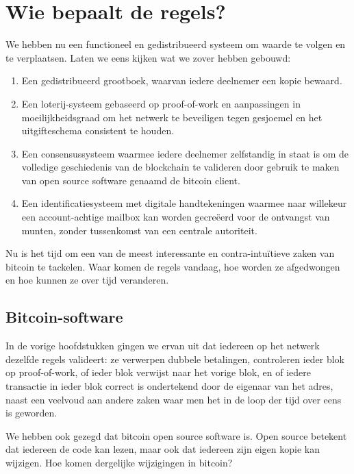 \documentclass[
  letterpaper,
]{scrbook}
\begin{document}
\hypertarget{wie-bepaalt-de-regels}{%
\chapter{Wie bepaalt de regels?}\label{wie-bepaalt-de-regels}}

We hebben nu een functioneel en gedistribueerd systeem om waarde te
volgen en te verplaatsen. Laten we eens kijken wat we zover hebben
gebouwd:

\begin{enumerate}
\def\labelenumi{\arabic{enumi}.}
\item
  Een gedistribueerd grootboek, waarvan iedere deelnemer een kopie
  bewaard.
\item
  Een loterij-systeem gebaseerd op proof-of-work en aanpassingen in
  moeilijkheidsgraad om het netwerk te beveiligen tegen gesjoemel en het
  uitgifteschema consistent te houden.
\item
  Een consensussysteem waarmee iedere deelnemer zelfstandig in staat is
  om de volledige geschiedenis van de blockchain te valideren door
  gebruik te maken van open source software genaamd de bitcoin client.
\item
  Een identificatiesysteem met digitale handtekeningen waarmee naar
  willekeur een account-achtige mailbox kan worden gecreëerd voor de
  ontvangst van munten, zonder tussenkomst van een centrale autoriteit.
\end{enumerate}

Nu is het tijd om een van de meest interessante en contra-intuïtieve
zaken van bitcoin te tackelen. Waar komen de regels vandaag, hoe worden
ze afgedwongen en hoe kunnen ze over tijd veranderen.

\hypertarget{bitcoin-software}{%
\section{Bitcoin-software}\label{bitcoin-software}}

In de vorige hoofdstukken gingen we ervan uit dat iedereen op het
netwerk dezelfde regels valideert: ze verwerpen dubbele betalingen,
controleren ieder blok op proof-of-work, of ieder blok verwijst naar het
vorige blok, en of iedere transactie in ieder blok correct is
ondertekend door de eigenaar van het adres, naast een veelvoud aan
andere zaken waar men het in de loop der tijd over eens is geworden.

We hebben ook gezegd dat bitcoin open source software is. Open source
betekent dat iedereen de code kan lezen, maar ook dat iedereen zijn
eigen kopie kan wijzigen. Hoe komen dergelijke wijzigingen in bitcoin?
\end{document}
